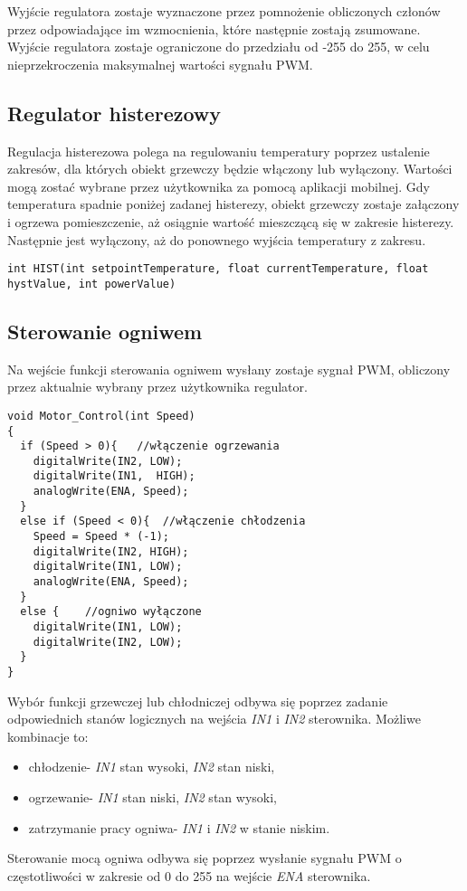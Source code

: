 Wyjście regulatora zostaje wyznaczone przez pomnożenie obliczonych członów przez odpowiadające im wzmocnienia, które następnie zostają zsumowane. Wyjście regulatora zostaje ograniczone do przedziału od -255 do 255, w celu nieprzekroczenia maksymalnej wartości sygnału PWM.

\subsection{Regulator histerezowy}%
Regulacja histerezowa polega na regulowaniu temperatury poprzez ustalenie zakresów, dla których obiekt grzewczy będzie włączony lub wyłączony. Wartości mogą zostać wybrane przez użytkownika za pomocą aplikacji mobilnej. Gdy temperatura spadnie poniżej zadanej histerezy, obiekt grzewczy zostaje załączony i ogrzewa pomieszczenie, aż osiągnie wartość mieszczącą się w zakresie histerezy. Następnie jest wyłączony, aż do ponownego wyjścia temperatury z zakresu.
\begin{lstlisting}
int HIST(int setpointTemperature, float currentTemperature, float hystValue, int powerValue)
\end{lstlisting}
\subsection{Sterowanie ogniwem}%
Na wejście funkcji sterowania ogniwem wysłany zostaje sygnał PWM, obliczony przez aktualnie wybrany przez użytkownika regulator.
\begin{lstlisting}
void Motor_Control(int Speed)
{
  if (Speed > 0){	//włączenie ogrzewania
    digitalWrite(IN2, LOW);
    digitalWrite(IN1,  HIGH);
    analogWrite(ENA, Speed);
  }
  else if (Speed < 0){	//włączenie chłodzenia
    Speed = Speed * (-1);
    digitalWrite(IN2, HIGH);
    digitalWrite(IN1, LOW);
    analogWrite(ENA, Speed);
  }
  else {	//ogniwo wyłączone
    digitalWrite(IN1, LOW);
    digitalWrite(IN2, LOW);
  }
}
\end{lstlisting}
Wybór funkcji grzewczej lub chłodniczej odbywa się poprzez zadanie odpowiednich stanów logicznych na wejścia \textit{IN1} i \textit{IN2} sterownika. Możliwe kombinacje to:
\begin{itemize}
\item chłodzenie- \textit{IN1} stan wysoki, \textit{IN2} stan niski,
\item ogrzewanie- \textit{IN1} stan niski, \textit{IN2} stan wysoki,
\item zatrzymanie pracy ogniwa- \textit{IN1} i \textit{IN2} w stanie niskim.
\end{itemize}
Sterowanie mocą ogniwa odbywa się poprzez wysłanie sygnału PWM o częstotliwości w zakresie od 0 do 255 na wejście \textit{ENA} sterownika.

